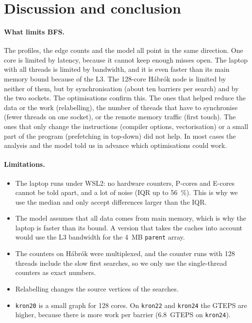 \section{Discussion and conclusion}
\label{sec:conclusion}

\paragraph{What limits BFS.} The profiles, the edge counts and the model all point in the same
direction. One core is limited by latency, because it cannot keep enough misses open. The
laptop with all threads is limited by bandwidth, and it is even faster than its main memory
bound because of the L3. The 128-core Hábrók node is limited by neither of them, but by
synchronisation (about ten barriers per search) and by the two sockets. The optimisations
confirm this. The ones that helped reduce the data or the work (relabelling), the number of
threads that have to synchronise (fewer threads on one socket), or the remote memory traffic
(first touch). The ones that only change the instructions (compiler options, vectorisation)
or a small part of the program (prefetching in top-down) did not help. In most cases the
analysis and the model told us in advance which optimisations could work.

\paragraph{Limitations.}
\begin{itemize}
  \item The laptop runs under WSL2: no hardware counters, P-cores and E-cores cannot be told
        apart, and a lot of noise (IQR up to \SI{56}{\percent}). This is why we use the median
        and only accept differences larger than the IQR.
  \item The model assumes that all data comes from main memory, which is why the laptop is
        faster than its bound. A version that takes the caches into account would use the L3
        bandwidth for the \SI{4}{MB} \texttt{parent} array.
  \item The counters on Hábrók were multiplexed, and the counter runs with 128 threads include
        the slow first searches, so we only use the single-thread counters as exact numbers.
  \item Relabelling changes the source vertices of the searches.
  \item \texttt{kron20} is a small graph for 128 cores. On \texttt{kron22} and \texttt{kron24}
        the GTEPS are higher, because there is more work per barrier (\SI{6.8}{GTEPS} on
        \texttt{kron24}).
\end{itemize}

